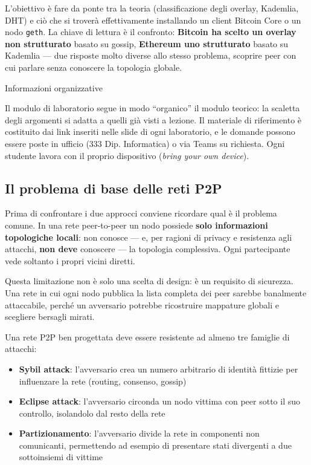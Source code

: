 \documentclass[
  italian,
  openany]{book}
\providecommand{\tightlist}{%
  \setlength{\itemsep}{0pt}\setlength{\parskip}{0pt}}
\begin{document}
L'obiettivo è fare da ponte tra la teoria (classificazione degli
overlay, Kademlia, DHT) e ciò che si troverà effettivamente installando
un client Bitcoin Core o un nodo \texttt{geth}. La chiave di lettura è
il confronto: \textbf{Bitcoin ha scelto un overlay non strutturato}
basato su gossip, \textbf{Ethereum uno strutturato} basato su Kademlia
--- due risposte molto diverse allo stesso problema, scoprire peer con
cui parlare senza conoscere la topologia globale.

\begin{calloutnote}{Informazioni organizzative}

Il modulo di laboratorio segue in modo ``organico'' il modulo teorico:
la scaletta degli argomenti si adatta a quelli già visti a lezione. Il
materiale di riferimento è costituito dai link inseriti nelle slide di
ogni laboratorio, e le domande possono essere poste in ufficio (333 Dip.
Informatica) o via Teams su richiesta. Ogni studente lavora con il
proprio dispositivo (\emph{bring your own device}).

\end{calloutnote}

\subsection{Il problema di base delle reti
P2P}\label{il-problema-di-base-delle-reti-p2p}

Prima di confrontare i due approcci conviene ricordare qual è il
problema comune. In una rete peer-to-peer un nodo possiede \textbf{solo
informazioni topologiche locali}: non conosce --- e, per ragioni di
privacy e resistenza agli attacchi, \textbf{non deve} conoscere --- la
topologia complessiva. Ogni partecipante vede soltanto i propri vicini
diretti.

Questa limitazione non è solo una scelta di design: è un requisito di
sicurezza. Una rete in cui ogni nodo pubblica la lista completa dei peer
sarebbe banalmente attaccabile, perché un avversario potrebbe
ricostruire mappature globali e scegliere bersagli mirati.

Una rete P2P ben progettata deve essere resistente ad almeno tre
famiglie di attacchi:

\begin{itemize}
\tightlist
\item
  \textbf{Sybil attack}: l'avversario crea un numero arbitrario di
  identità fittizie per influenzare la rete (routing, consenso, gossip)
\item
  \textbf{Eclipse attack}: l'avversario circonda un nodo vittima con
  peer sotto il suo controllo, isolandolo dal resto della rete
\item
  \textbf{Partizionamento}: l'avversario divide la rete in componenti
  non comunicanti, permettendo ad esempio di presentare stati divergenti
  a due sottoinsiemi di vittime
\end{itemize}
\end{document}
